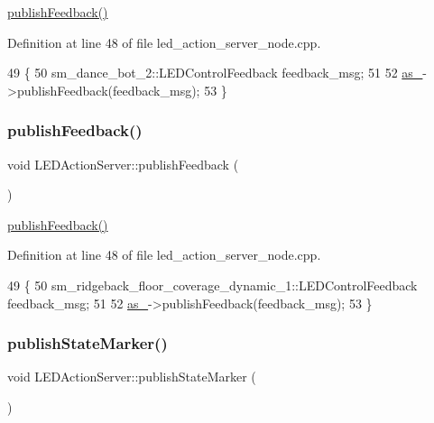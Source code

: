 \hyperlink{classLEDActionServer_a25c93d4e7ecdacbb4f5b090d7789aa36}{publish\+Feedback()} 

Definition at line 48 of file led\+\_\+action\+\_\+server\+\_\+node.\+cpp.


\begin{DoxyCode}
49 \{
50     sm\_dance\_bot\_2::LEDControlFeedback feedback\_msg;
51     
52     \hyperlink{classLEDActionServer_a61d21c77642081acf017d4ebd65b2de0}{as\_}->publishFeedback(feedback\_msg);
53 \}
\end{DoxyCode}
\mbox{\label{classLEDActionServer_a25c93d4e7ecdacbb4f5b090d7789aa36}} 
\subsubsection{\texorpdfstring{publish\+Feedback()}{publishFeedback()}\hspace{0.1cm}{\footnotesize\ttfamily [5/5]}}
{\footnotesize\ttfamily void L\+E\+D\+Action\+Server\+::publish\+Feedback (\begin{DoxyParamCaption}{ }\end{DoxyParamCaption})\hspace{0.3cm}{\ttfamily [inline]}}

\hyperlink{classLEDActionServer_a25c93d4e7ecdacbb4f5b090d7789aa36}{publish\+Feedback()} 

Definition at line 48 of file led\+\_\+action\+\_\+server\+\_\+node.\+cpp.


\begin{DoxyCode}
49 \{
50     sm\_ridgeback\_floor\_coverage\_dynamic\_1::LEDControlFeedback feedback\_msg;
51     
52     \hyperlink{classLEDActionServer_a61d21c77642081acf017d4ebd65b2de0}{as\_}->publishFeedback(feedback\_msg);
53 \}
\end{DoxyCode}
\mbox{\label{classLEDActionServer_a73bb754ac2347c50660624ad92315895}} 
\subsubsection{\texorpdfstring{publish\+State\+Marker()}{publishStateMarker()}\hspace{0.1cm}{\footnotesize\ttfamily [1/5]}}
{\footnotesize\ttfamily void L\+E\+D\+Action\+Server\+::publish\+State\+Marker (\begin{DoxyParamCaption}{ }\end{DoxyParamCaption})\hspace{0.3cm}{\ttfamily [inline]}}


